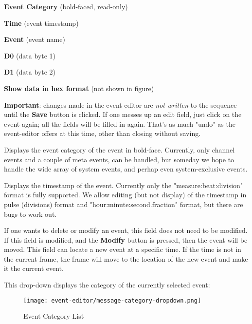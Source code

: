    \begin{enumber}
      \item \textbf{Event Category} (bold-faced, read-only)
      \item \textbf{Time} (event timestamp)
      \item \textbf{Event} (event name)
      \item \textbf{D0} (data byte 1)
      \item \textbf{D1} (data byte 2)
      \item \textbf{Show data in hex format} (not shown in figure)
   \end{enumber}

   \textbf{Important}: changes made in the event editor
   are \textsl{not written} to the sequence until the \textbf{Save}
   button is clicked.  If one messes up an edit field, just click on the event
   again; all the fields will be filled in again.
   That's as much "undo" as the event-editor offers at this time, other than
   closing without saving.

   \setcounter{ItemCounter}{0}      %

   Displays the event category of the event in bold-face.
   Currently, only channel events
   and a couple of meta events,
   can be handled, but someday we hope to handle the wide array of system
   events, and perhap even system-exclusive events.

   Displays the timestamp of the event.  Currently only the
   "measure:beat:division" format is fully supported.
   We allow editing (but not display) of the timestamp in
   pulse (divisions) format and "hour:minute:second.fraction" format, but
   there are bugs to work out.

   If one wants to delete or modify an event, this field does not need to be
   modified.  If this field is modified, and the \textbf{Modify}
   button is pressed, then the event will be moved.  This field can locate
   a new event at a specific time.  If the time is not in the current frame,
   the frame will move to the location of the new event and make it the current
   event.

   This drop-down displays the category of the currently selected event:

\begin{figure}[H]
   \centering
   \texttt{[image: event-editor/message-category-dropdown.png]}
   \caption{Event Category List}
   \label{fig:event_editor_category_dropdown}
\end{figure}

